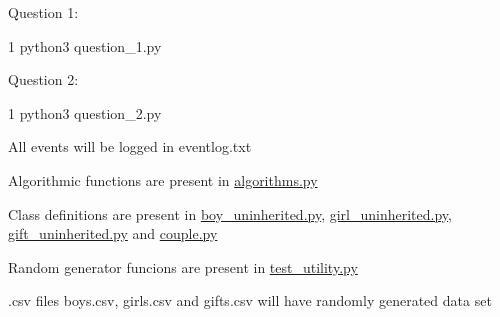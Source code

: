 \begin{DoxyItemize}
\item Question 1\+: 
\begin{DoxyCode}
1 python3 question\_1.py
\end{DoxyCode}

\item Question 2\+: 
\begin{DoxyCode}
1 python3 question\_2.py
\end{DoxyCode}

\item All events will be logged in {\ttfamily eventlog.\+txt}
\item Algorithmic functions are present in {\ttfamily \hyperlink{algorithms_8py}{algorithms.\+py}}
\item Class definitions are present in {\ttfamily \hyperlink{boy__uninherited_8py}{boy\+\_\+uninherited.\+py}}, {\ttfamily \hyperlink{girl__uninherited_8py}{girl\+\_\+uninherited.\+py}}, {\ttfamily \hyperlink{gift__uninherited_8py}{gift\+\_\+uninherited.\+py}} and {\ttfamily \hyperlink{couple_8py}{couple.\+py}}
\item Random generator funcions are present in {\ttfamily \hyperlink{test__utility_8py}{test\+\_\+utility.\+py}}
\item .csv files {\ttfamily boys.\+csv}, {\ttfamily girls.\+csv} and {\ttfamily gifts.\+csv} will have randomly generated data set 
\end{DoxyItemize}